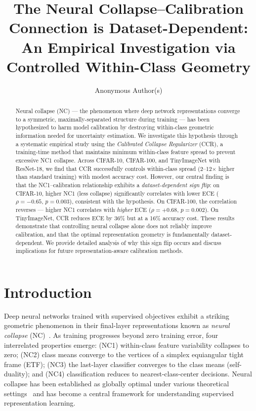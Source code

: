 \documentclass{article}
\title{The Neural Collapse--Calibration Connection is Dataset-Dependent:\\An Empirical Investigation via Controlled Within-Class Geometry}
\author{
  Anonymous Author(s)
}
\begin{document}
\maketitle

\begin{abstract}
Neural collapse (NC) --- the phenomenon where deep network representations converge to a symmetric, maximally-separated structure during training --- has been hypothesized to harm model calibration by destroying within-class geometric information needed for uncertainty estimation. We investigate this hypothesis through a systematic empirical study using the \emph{Calibrated Collapse Regularizer} (CCR), a training-time method that maintains minimum within-class feature spread to prevent excessive NC1 collapse. Across CIFAR-10, CIFAR-100, and TinyImageNet with ResNet-18, we find that CCR successfully controls within-class spread (2--12$\times$ higher than standard training) with modest accuracy cost. However, our central finding is that the NC1--calibration relationship exhibits a \emph{dataset-dependent sign flip}: on CIFAR-10, higher NC1 (less collapse) significantly correlates with lower ECE ($\rho = -0.65$, $p = 0.003$), consistent with the hypothesis. On CIFAR-100, the correlation reverses --- higher NC1 correlates with \emph{higher} ECE ($\rho = +0.68$, $p = 0.002$). On TinyImageNet, CCR reduces ECE by 36\% but at a 16\% accuracy cost. These results demonstrate that controlling neural collapse alone does not reliably improve calibration, and that the optimal representation geometry is fundamentally dataset-dependent. We provide detailed analysis of why this sign flip occurs and discuss implications for future representation-aware calibration methods.
\end{abstract}

\section{Introduction}

Deep neural networks trained with supervised objectives exhibit a striking geometric phenomenon in their final-layer representations known as \emph{neural collapse} (NC)~\citep{papyan2020prevalence}. As training progresses beyond zero training error, four interrelated properties emerge: (NC1) within-class feature variability collapses to zero; (NC2) class means converge to the vertices of a simplex equiangular tight frame (ETF); (NC3) the last-layer classifier converges to the class means (self-duality); and (NC4) classification reduces to nearest-class-center decisions. Neural collapse has been established as globally optimal under various theoretical settings~\citep{zhu2021geometric} and has become a central framework for understanding supervised representation learning.
\end{document}
